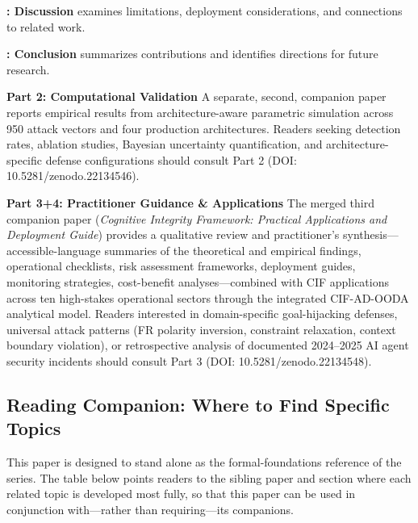 \documentclass[
]{article}
\begin{document}
\textbf{: Discussion} examines limitations,
deployment considerations, and connections to related work.

\textbf{: Conclusion} summarizes contributions and
identifies directions for future research.

\textbf{Part 2: Computational Validation} A separate, second, companion
paper reports empirical results from architecture-aware parametric
simulation across 950 attack vectors and four production architectures.
Readers seeking detection rates, ablation studies, Bayesian uncertainty
quantification, and architecture-specific defense configurations should
consult Part 2 (DOI: 10.5281/zenodo.22134546).

\textbf{Part 3+4: Practitioner Guidance \& Applications} The merged
third companion paper
(\emph{Cognitive Integrity Framework: Practical Applications and Deployment Guide})
provides a qualitative review and practitioner's
synthesis---accessible-language summaries of the theoretical and
empirical findings, operational checklists, risk assessment frameworks,
deployment guides, monitoring strategies, cost-benefit
analyses---combined with CIF applications across ten high-stakes
operational sectors through the integrated CIF-AD-OODA analytical model.
Readers interested in domain-specific goal-hijacking defenses, universal
attack patterns (FR polarity inversion, constraint relaxation, context
boundary violation), or retrospective analysis of documented 2024--2025
AI agent security incidents should consult Part 3 (DOI:
10.5281/zenodo.22134548).

\subsection{Reading Companion: Where to Find Specific
Topics}\label{sec:reading-companion}

This paper is designed to stand alone as the formal-foundations
reference of the series. The table below points readers to the sibling
paper and section where each related topic is developed most fully, so
that this paper can be used in conjunction with---rather than
requiring---its companions.
\end{document}
